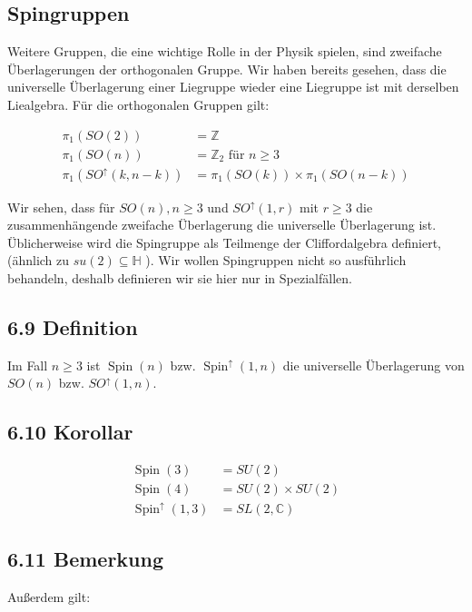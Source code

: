 \documentclass[10pt, letterpaper]{article}
\begin{document}
\subsection{Spingruppen}

Weitere Gruppen, die eine wichtige Rolle in der Physik spielen, sind zweifache Überlagerungen der orthogonalen Gruppe. Wir haben bereits gesehen, dass die universelle Überlagerung einer Liegruppe wieder eine Liegruppe ist mit derselben Liealgebra. Für die orthogonalen Gruppen gilt:

$$
\begin{aligned}
\pi_{1}(S O(2)) & =\mathbb{Z} \\
\pi_{1}(S O(n)) & =\mathbb{Z}_{2} \text { für } n \geq 3 \\
\pi_{1}\left(S O^{\uparrow}(k, n-k)\right) & =\pi_{1}(S O(k)) \times \pi_{1}(S O(n-k))
\end{aligned}
$$

Wir sehen, dass für $S O(n), n \geq 3$ und $S O^{\uparrow}(1, r)$ mit $r \geq 3$ die zusammenhängende zweifache Überlagerung die universelle Überlagerung ist. Üblicherweise wird die Spingruppe als Teilmenge der Cliffordalgebra definiert, (ähnlich zu $s u(2) \subseteq \mathbb{H}$ ). Wir wollen Spingruppen nicht so ausführlich behandeln, deshalb definieren wir sie hier nur in Spezialfällen.

\subsection*{6.9 Definition}
Im Fall $n \geq 3$ ist $\operatorname{Spin}(n)$ bzw. $\operatorname{Spin}^{\uparrow}(1, n)$ die universelle Überlagerung von $S O(n)$ bzw. $S O^{\uparrow}(1, n)$.

\subsection*{6.10 Korollar}
$$
\begin{aligned}
\operatorname{Spin}(3) & =S U(2) \\
\operatorname{Spin}(4) & =S U(2) \times S U(2) \\
\operatorname{Spin}^{\uparrow}(1,3) & =S L(2, \mathbb{C})
\end{aligned}
$$

\subsection*{6.11 Bemerkung}
Außerdem gilt:
\end{document}
